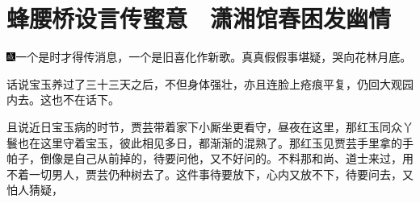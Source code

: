 

\chapter{蜂腰桥设言传蜜意　潇湘馆春困发幽情}\label{part0030_split_000.htmlux5cux23calibre_pb_0}

{\includegraphics[width=3mm]{../Images/00005}一个是时才得传消息，一个是旧喜化作新歌。真真假假事堪疑，哭向花林月底。}

话说宝玉养过了三十三天之后，不但身体强壮，亦且连脸上疮痕平复，仍回大观园内去。这也不在话下。

且说近日宝玉病的时节，贾芸带着家下小厮坐更看守，昼夜在这里，那红玉同众丫鬟也在这里守着宝玉，彼此相见多日，都渐渐的混熟了。那红玉见贾芸手里拿的手帕子，倒像是自己从前掉的，待要问他，又不好问的。不料那和尚、道士来过，用不着一切男人，贾芸仍种树去了。这件事待要放下，心内又放不下，待要问去，又怕人猜疑，